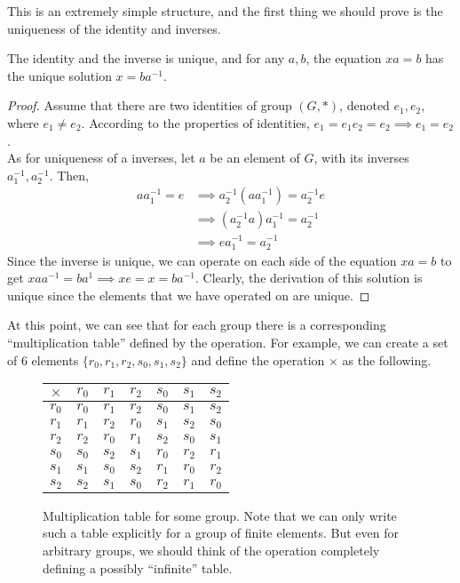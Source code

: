   This is an extremely simple structure, and the first thing we should prove is the uniqueness of the identity and inverses. 

  \begin{lemma}
    \label{thm:unique_add_inverse}
    The identity and the inverse is unique, and for any $a, b$, the equation $x a = b$ has the unique solution $x = b a^{-1}$.
  \end{lemma}
  \begin{proof}
     Assume that there are two identities of group $(G,*)$, denoted $e_{1}, e_{2}$, where $e_{1} \neq e_{2}$. According to the properties of identities, $e_{1} = e_{1} e_{2} = e_{2} \implies e_{1} = e_{2}$. \\
    As for uniqueness of a inverses, let $a$ be an element of $G$, with its inverses $a_{1}^{-1}, a_{2}^{-1}$. Then, 
    \begin{align}
      a a_{1}^{-1} = e & \implies a_{2}^{-1} (a a_{1}^{-1} )= a_{2}^{-1} e \\
                       & \implies (a_{2}^{-1} a) a_{1}^{-1} = a_{2}^{-1} \\
                       & \implies e a_{1}^{-1} = a_{2}^{-1}
    \end{align}
    Since the inverse is unique, we can operate on each side of the equation $x a = b$ to get $x a a^{-1} = b a^{1} \implies x  e = x = b a^{-1}$. Clearly, the derivation of this solution is unique since the elements that we have operated on are unique.
  \end{proof} 
  
  At this point, we can see that for each group there is a corresponding ``multiplication table'' defined by the operation. For example, we can create a set of $6$ elements $\{r_0, r_1, r_2, s_0, s_1, s_2\}$ and define the operation $\times$ as the following. 

  \begin{figure}[H]
    \centering 
    \begin{tabular}{c|cccccc}
      $\times$ & $r_0$ & $r_1$ & $r_2$ & $s_0$ & $s_1$ & $s_2$ \\
      \hline
      $r_0$ & $r_0$ & $r_1$ & $r_2$ & $s_0$ & $s_1$ & $s_2$ \\
      $r_1$ & $r_1$ & $r_2$ & $r_0$ & $s_1$ & $s_2$ & $s_0$ \\
      $r_2$ & $r_2$ & $r_0$ & $r_1$ & $s_2$ & $s_0$ & $s_1$ \\
      $s_0$ & $s_0$ & $s_2$ & $s_1$ & $r_0$ & $r_2$ & $r_1$ \\
      $s_1$ & $s_1$ & $s_0$ & $s_2$ & $r_1$ & $r_0$ & $r_2$ \\
      $s_2$ & $s_2$ & $s_1$ & $s_0$ & $r_2$ & $r_1$ & $r_0$ \\
    \end{tabular}
    \caption{Multiplication table for some group. Note that we can only write such a table explicitly for a group of finite elements. But even for arbitrary groups, we should think of the operation completely defining a possibly ``infinite'' table.} 
  \end{figure} 

